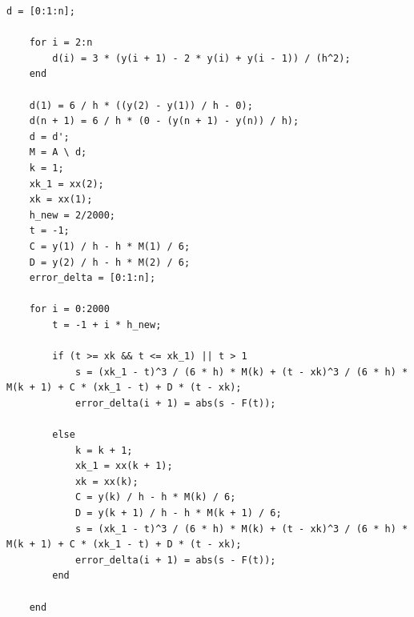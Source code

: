 \documentclass[12pt,a4paper,UTF8]{ctexart}
\theoremstyle{nonumberplain}
\begin{document}
\begin{enumerate}
\begin{enumerate}
\begin{lstlisting}[frame=single]
    d = [0:1:n];

    for i = 2:n
        d(i) = 3 * (y(i + 1) - 2 * y(i) + y(i - 1)) / (h^2);
    end

    d(1) = 6 / h * ((y(2) - y(1)) / h - 0);
    d(n + 1) = 6 / h * (0 - (y(n + 1) - y(n)) / h);
    d = d';
    M = A \ d;
    k = 1;
    xk_1 = xx(2);
    xk = xx(1);
    h_new = 2/2000;
    t = -1;
    C = y(1) / h - h * M(1) / 6;
    D = y(2) / h - h * M(2) / 6;
    error_delta = [0:1:n];

    for i = 0:2000
        t = -1 + i * h_new;

        if (t >= xk && t <= xk_1) || t > 1
            s = (xk_1 - t)^3 / (6 * h) * M(k) + (t - xk)^3 / (6 * h) * M(k + 1) + C * (xk_1 - t) + D * (t - xk);
            error_delta(i + 1) = abs(s - F(t));

        else
            k = k + 1;
            xk_1 = xx(k + 1);
            xk = xx(k);
            C = y(k) / h - h * M(k) / 6;
            D = y(k + 1) / h - h * M(k + 1) / 6;
            s = (xk_1 - t)^3 / (6 * h) * M(k) + (t - xk)^3 / (6 * h) * M(k + 1) + C * (xk_1 - t) + D * (t - xk);
            error_delta(i + 1) = abs(s - F(t));
        end

    end


\end{lstlisting}
\end{enumerate}
\end{enumerate}
\end{document}
